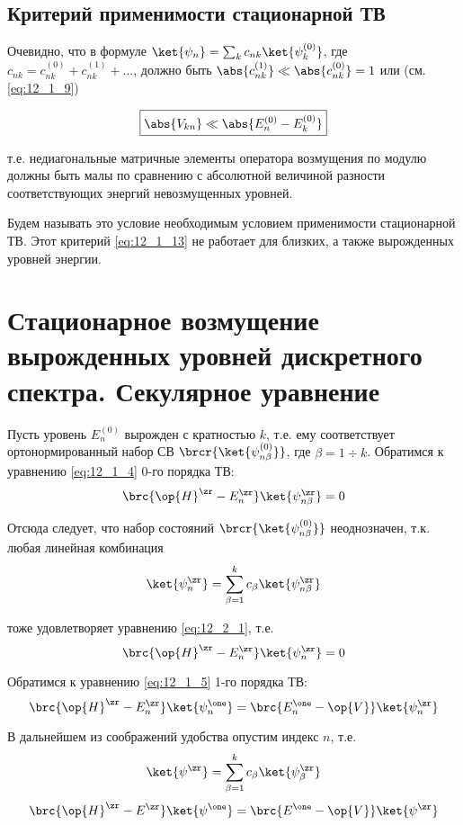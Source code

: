 \subsection{Критерий применимости стационарной ТВ}
 
Очевидно, что в формуле $\ket{\psi_n} = \sum_k c_{nk} \ket{\psi_k^{(0)}}$, где $c_{nk} = c_{nk}^{(0)} + c_{nk}^{(1)} + ...$, должно быть $\abs{c_{nk}^{(1)}} \ll \abs{c_{nk}^{(0)}} = 1$ или (см. \eqref{eq:12_1_9})

\begin{equation}
\label{eq:12_1_13}
\boxed{\abs{V_{kn}} \ll \abs{E_n^{(0)} - E_k^{(0)}}}
\end{equation}

т.е. недиагональные матричные элементы оператора возмущения по модулю должны быть малы по сравнению с абсолютной величиной разности соответствующих энергий невозмущенных уровней.

Будем называть это условие необходимым условием применимости стационарной ТВ. Этот критерий \eqref{eq:12_1_13} не работает для близких, а также вырожденных уровней энергии.

\section{Стационарное возмущение вырожденных уровней дискретного спектра. Секулярное уравнение}

Пусть уровень $E_n^{(0)}$ вырожден с кратностью $k$, т.е. ему соответствует ортонормированный набор СВ $\brcr{\ket{\psi_{n \beta}^{(0)}}}$, где $\beta = 1 \div k$. Обратимся к уравнению \eqref{eq:12_1_4} 0-го порядка ТВ:
\begin{equation}
\label{eq:12_2_1}
\brc{\op{H}^\zr - E_n^\zr} \ket{\psi_{n \beta}^\zr} = 0
\end{equation}

Отсюда следует, что набор состояний $\brcr{\ket{\psi_{n \beta}^{(0)}}}$ неоднозначен, т.к. любая линейная комбинация
$$
\ket{\psi_n^\zr} = \sum_{\beta = 1}^k c_\beta \ket{\psi_{n \beta}^\zr}
$$

тоже удовлетворяет уравнению \eqref{eq:12_2_1}, т.е.
$$
\brc{\op{H}^\zr - E_n^\zr} \ket{\psi_{n}^\zr} = 0
$$

Обратимся к уравнению \eqref{eq:12_1_5} 1-го порядка ТВ:
$$
\brc{\op{H}^\zr - E_n^\zr} \ket{\psi_{n} ^\one} = \brc{E_n^\one - \op{V}} \ket{\psi_n^\zr}
$$

В дальнейшем из соображений удобства опустим индекс $n$, т.е.
$$
\ket{\psi^\zr} = \sum_{\beta = 1}^k c_\beta \ket{\psi_{\beta}^\zr}
$$
\begin{equation}
\label{eq:12_2_2}
\brc{\op{H}^\zr - E^\zr} \ket{\psi ^\one} = \brc{E^\one - \op{V}} \ket{\psi^\zr}
\end{equation}


